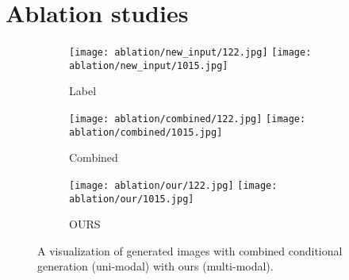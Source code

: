 \documentclass[10pt,twocolumn,letterpaper]{article}
\begin{document}
\section{Ablation studies}
\begin{figure}[t!]
    \centering
    \begin{subfigure}[t]{0.250\linewidth}
      \captionsetup{justification=centering, labelformat=empty, font=scriptsize}
      \texttt{[image: ablation/new\_input/122.jpg]}
      \texttt{[image: ablation/new\_input/1015.jpg]}
      \caption{Label}
    \end{subfigure}
\begin{subfigure}[t]{0.250\linewidth}
      \captionsetup{justification=centering, labelformat=empty, font=scriptsize}
      \texttt{[image: ablation/combined/122.jpg]}
      \texttt{[image: ablation/combined/1015.jpg]}
      \caption{Combined}
    \end{subfigure}
    \begin{subfigure}[t]{0.250\linewidth}
      \captionsetup{justification=centering, labelformat=empty, font=scriptsize}
      \texttt{[image: ablation/our/122.jpg]}
      \texttt{[image: ablation/our/1015.jpg]}
      \caption{OURS}
    \end{subfigure}
    \vspace{-3mm}    \caption{A visualization of generated images with combined conditional generation (uni-modal) with ours (multi-modal).  }
    \label{fig:ablation}
    \vspace{-2mm}
  \end{figure}
 
 
\end{document}
